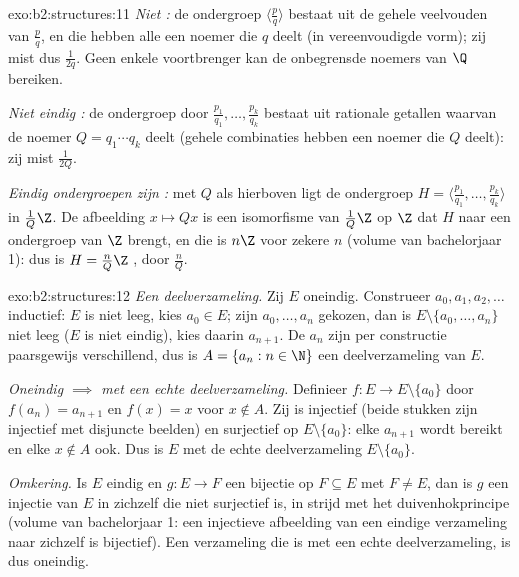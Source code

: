 \begin{solution}{exo:b2:structures:11}
\emph{Niet :} de ondergroep $\langle \frac pq\rangle$
bestaat uit de gehele veelvouden van $\frac pq$, en die hebben
alle een noemer die $q$ deelt (in vereenvoudigde vorm); zij mist
dus $\frac{1}{2q}$. Geen enkele voortbrenger kan de onbegrensde
noemers van $\Q$ bereiken.

\emph{Niet eindig :} de ondergroep  door
$\frac{p_1}{q_1}, \dots, \frac{p_k}{q_k}$ bestaat uit rationale
getallen waarvan de noemer $Q = q_1 \cdots q_k$ deelt (gehele
combinaties hebben een noemer die $Q$ deelt): zij mist
$\frac{1}{2Q}$.

\emph{Eindig  ondergroepen zijn :} met $Q$
als hierboven ligt de ondergroep $H = \langle \frac{p_1}{q_1},
\dots, \frac{p_k}{q_k}\rangle$ in $\frac{1}{Q}\Z$. De afbeelding
$x \mapsto Qx$ is een isomorfisme van $\frac1Q\Z$ op $\Z$ dat $H$
naar een ondergroep van $\Z$ brengt, en die is $n\Z$ voor zekere
$n$ (volume van bachelorjaar 1): dus is $H = \frac{n}{Q}\Z$
,  door $\frac nQ$.
\end{solution}

\begin{solution}{exo:b2:structures:12}
\emph{Een  deelverzameling.} Zij $E$ oneindig. Construeer
$a_0, a_1, a_2, \dots$ inductief: $E$ is niet leeg, kies $a_0 \in
E$; zijn $a_0, \dots, a_n$ gekozen, dan is $E \setminus \{a_0,
\dots, a_n\}$ niet leeg ($E$ is niet eindig), kies daarin
$a_{n+1}$. De $a_n$ zijn per constructie paarsgewijs verschillend,
dus is $A = \{a_n : n \in \N\}$ een  deelverzameling van
$E$.

\emph{Oneindig $\implies$  met een echte
deelverzameling.} Definieer $f \colon E \to E \setminus \{a_0\}$
door $f(a_n) = a_{n+1}$ en $f(x) = x$ voor $x \notin A$. Zij is
injectief (beide stukken zijn injectief met disjuncte beelden) en
surjectief op $E \setminus \{a_0\}$: elke $a_{n+1}$ wordt bereikt
en elke $x \notin A$ ook. Dus is $E$  met de echte
deelverzameling $E \setminus \{a_0\}$.

\emph{Omkering.} Is $E$ eindig en $g \colon E \to F$ een bijectie
op $F \subseteq E$ met $F \neq E$, dan is $g$ een injectie van $E$
in zichzelf die niet surjectief is, in strijd met het
duivenhokprincipe (volume van bachelorjaar 1: een injectieve
afbeelding van een eindige verzameling naar zichzelf is
bijectief). Een verzameling die  is met een echte
deelverzameling, is dus oneindig.
\end{solution}


